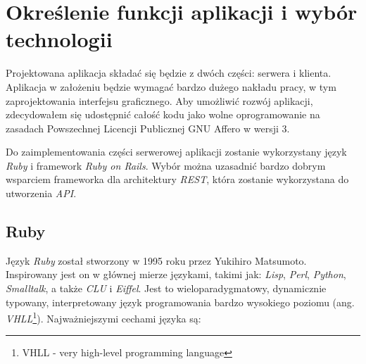 \documentclass[a4paper,12pt]{article}
\begin{document}
\clearpage

\section{Określenie funkcji aplikacji i wybór technologii}
Projektowana aplikacja składać się będzie z dwóch części: serwera i
klienta. Aplikacja w założeniu będzie wymagać bardzo dużego nakładu
pracy, w tym zaprojektowania interfejsu graficznego. Aby umożliwić
rozwój aplikacji, zdecydowałem się udostępnić całość kodu jako wolne
oprogramowanie na zasadach Powszechnej Licencji Publicznej GNU Affero
w wersji 3\cite{affero}.

Do zaimplementowania części serwerowej aplikacji zostanie wykorzystany
język \emph{Ruby} i framework \emph{Ruby on Rails}. Wybór można
uzasadnić bardzo dobrym wsparciem frameworka dla architektury
\emph{REST}, która zostanie wykorzystana do utworzenia \emph{API}.

\subsection{Ruby}
Język \emph{Ruby} został stworzony w 1995 roku przez Yukihiro
Matsumoto. Inspirowany jest on w głównej mierze językami, takimi jak:
\emph{Lisp}, \emph{Perl}, \emph{Python}, \emph{Smalltalk}, a także
\emph{CLU} i \emph{Eiffel}. Jest to wieloparadygmatowy, dynamicznie
typowany, interpretowany język programowania bardzo wysokiego poziomu
(ang. \emph{VHLL}\footnote{VHLL - very high-level programming
  language})\cite{ruby}. Najważniejszymi cechami języka są:
\end{document}

